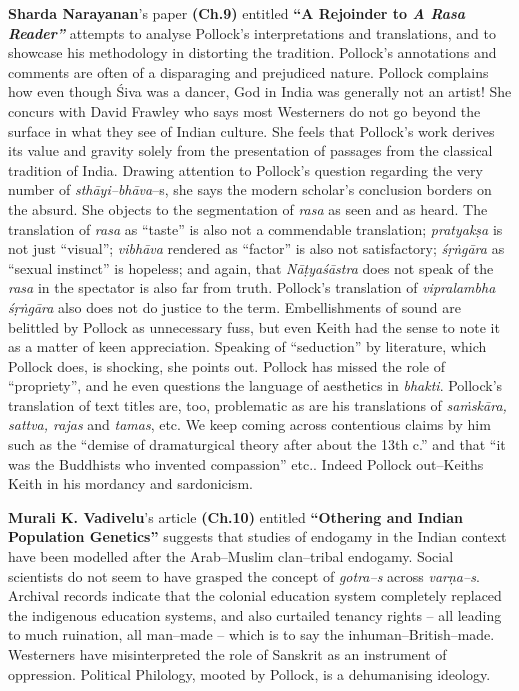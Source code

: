 \textbf{Sharda Narayanan}’s paper \textbf{(Ch.9)} entitled \textbf{“A Rejoinder to \textit{A Rasa Reader”}} attempts to analyse Pollock’s interpretations and translations, and to showcase his methodology in distorting the tradition. Pollock’s annotations and comments are often of a disparaging and prejudiced nature. Pollock complains how even though Śiva was a dancer, God in India was generally not an artist! She concurs with David Frawley who says most Westerners do not go beyond the surface in what they see of Indian culture. She feels that Pollock’s work derives its value and gravity solely from the presentation of passages from the classical tradition of India. Drawing attention to Pollock’s question regarding the very number of \textit{sthāyi–bhāva}–s, she says the modern scholar’s conclusion borders on the absurd. She objects to the segmentation of \textit{rasa} as seen and as heard. The translation of \textit{rasa} as “taste” is also not a commendable translation; \textit{pratyakṣa} is not just “visual”; \textit{vibhāva} rendered as “factor” is also not satisfactory; \textit{śṛṅgāra} as “sexual instinct” is hopeless; and again, that \textit{Nāṭyaśāstra} does not speak of the \textit{rasa} in the spectator is also far from truth. Pollock’s translation of \textit{vipralambha śṛṅgāra} also does not do justice to the term. Embellishments of sound are belittled by Pollock as unnecessary fuss, but even Keith had the sense to note it as a matter of keen appreciation. Speaking of “seduction” by literature, which Pollock does, is shocking, she points out. Pollock has missed the role of “propriety”, and he even questions the language of aesthetics in \textit{bhakti}. Pollock’s translation of text titles are, too, problematic as are his translations of \textit{saṁskāra, sattva, rajas} and \textit{tamas}, etc. We keep coming across contentious claims by him such as the “demise of dramaturgical theory after about the 13th c.” and that “it was the Buddhists who invented compassion” etc.. Indeed Pollock out–Keiths Keith in his mordancy and sardonicism.

\textbf{Murali K. Vadivelu}’s article \textbf{(Ch.10)} entitled \textbf{“Othering and Indian Population Genetics”} suggests that studies of endogamy in the Indian context have been modelled after the Arab–Muslim clan–tribal endogamy. Social scientists do not seem to have grasped the concept of \textit{gotra–s} across \textit{varṇa–s}. Archival records indicate that the colonial education system completely replaced the indigenous education systems, and also curtailed tenancy rights – all leading to much ruination, all man–made – which is to say the inhuman–British–made. Westerners have misinterpreted the role of Sanskrit as an instrument of oppression. Political Philology, mooted by Pollock, is a dehumanising ideology.


